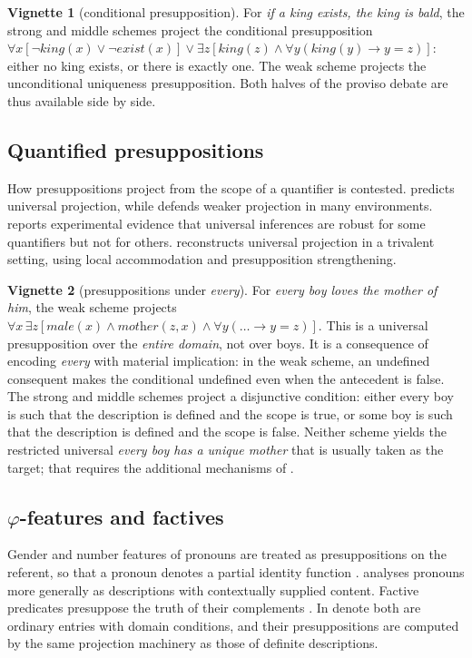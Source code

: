 \documentclass[11pt,a4paper]{article}
\newcommand{\dn}{\textsf{denote}}
\theoremstyle{definition}
\newtheorem{vignette}{Vignette}
\begin{document}
\begin{vignette}[conditional presupposition]\label{v:proviso}
For \textit{if a king exists, the king is bald}, the strong and middle schemes project the conditional presupposition $\forall x[\neg\textit{king}(x)\vee\neg\textit{exist}(x)]\vee\exists z[\textit{king}(z)\wedge\forall y(\textit{king}(y)\to y=z)]$: either no king exists, or there is exactly one. The weak scheme projects the unconditional uniqueness presupposition. Both halves of the proviso debate are thus available side by side.
\end{vignette}

\subsection{Quantified presuppositions}
How presuppositions project from the scope of a quantifier is contested. \citet{heim1983} predicts universal projection, while \citet{beaver2001} defends weaker projection in many environments. \citet{chemla2009} reports experimental evidence that universal inferences are robust for some quantifiers but not for others. \citet{fox2013} reconstructs universal projection in a trivalent setting, using local accommodation and presupposition strengthening.

\begin{vignette}[presuppositions under \textit{every}]\label{v:quantpresup}
For \textit{every boy loves the mother of him}, the weak scheme projects $\forall x\,\exists z[\textit{male}(x)\wedge\textit{mother}(z,x)\wedge\forall y(\ldots\to y=z)]$. This is a universal presupposition over the \emph{entire domain}, not over boys. It is a consequence of encoding \textit{every} with material implication: in the weak scheme, an undefined consequent makes the conditional undefined even when the antecedent is false. The strong and middle schemes project a disjunctive condition: either every boy is such that the description is defined and the scope is true, or some boy is such that the description is defined and the scope is false. Neither scheme yields the restricted universal \textit{every boy has a unique mother} that is usually taken as the target; that requires the additional mechanisms of \citet{fox2013}.
\end{vignette}

\subsection{\texorpdfstring{$\varphi$}{phi}-features and factives}
Gender and number features of pronouns are treated as presuppositions on the referent, so that a pronoun denotes a partial identity function \citep{cooper1983,heimkratzer1998,heim2008}. \citet{cooper1979} analyses pronouns more generally as descriptions with contextually supplied content. Factive predicates presuppose the truth of their complements \citep{kiparsky1970}. In \dn{} both are ordinary entries with domain conditions, and their presuppositions are computed by the same projection machinery as those of definite descriptions.
\end{document}

